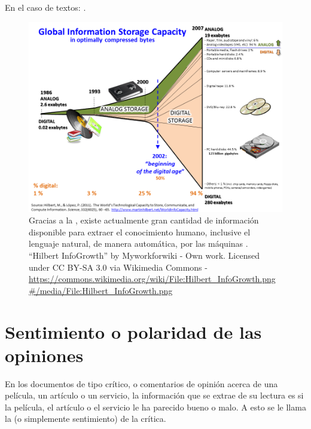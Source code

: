 En el caso de textos: .

\begin{landscape}
\begin{figure}[htbp]
\centering
\includegraphics[height=0.85\textwidth]{Hilbert-InfoGrowth}
\caption[Explosión de información digital]{Gracias a la , existe actualmente gran cantidad de información disponible para extraer el conocimiento humano, inclusive el lenguaje natural, de manera automática, por las máquinas \citep{Hilbert2011}. \\
{\footnotesize ``Hilbert InfoGrowth'' by Myworkforwiki - Own work. Licensed under CC BY-SA 3.0 via Wikimedia Commons - \url{https://commons.wikimedia.org/wiki/File:Hilbert_InfoGrowth.png\#/media/File:Hilbert_InfoGrowth.png}}}
\label{fig:InfoGrowth}
\end{figure}
\end{landscape}

\section{Sentimiento o polaridad de las opiniones}

En los documentos de tipo crítico, o comentarios de opinión acerca de una película, un artículo o un servicio, la información que se extrae de su lectura es si la película, el artículo o el servicio le ha parecido bueno o malo. A esto se le llama la  (o simplemente sentimiento) de la crítica.

